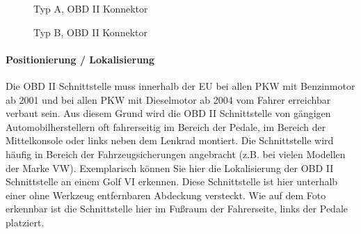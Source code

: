 \begin{figure}[!htb]\centering
   \begin{minipage}{0.49\textwidth}
     \caption{Typ A, OBD II Konnektor \cite{SIMR.CH2-obd2.OBDIITypeA}}\label{Fig:Data1}
   \end{minipage}
   \begin {minipage}{0.49\textwidth}
     \caption{Typ B, OBD II Konnektor \cite{SIMR.CH2-obd2.OBDIITypeB}}\label{Fig:Data2}
   \end{minipage}
\end{figure}


\paragraph{Positionierung / Lokalisierung\nextline}
Die OBD II Schnittstelle muss innerhalb der EU bei allen PKW mit Benzinmotor ab 2001 und bei allen PKW mit Dieselmotor ab 2004 vom Fahrer erreichbar verbaut sein. Aus diesem Grund wird die OBD II Schnittstelle von gängigen Automobilherstellern oft fahrerseitig im Bereich der Pedale, im Bereich der Mittelkonsole oder links neben dem Lenkrad montiert. Die Schnittstelle wird häufig in  Bereich der Fahrzeugsicherungen angebracht (z.B. bei vielen Modellen der Marke VW).
Exemplarisch können Sie hier die Lokalisierung der OBD II Schnittstelle an einem Golf VI erkennen. Diese Schnittstelle ist hier unterhalb einer ohne Werkzeug entfernbaren Abdeckung versteckt. Wie auf dem Foto erkennbar ist die Schnittstelle hier im Fußraum der Fahrerseite, links der Pedale platziert.

